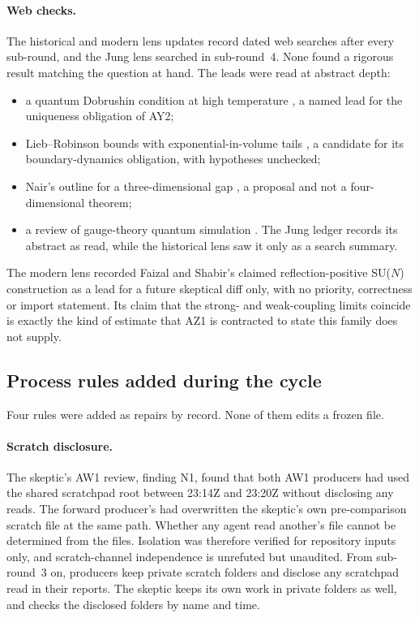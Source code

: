 \paragraph{Web checks.}
The historical and modern lens updates record dated web searches after every
sub-round, and the Jung lens searched in sub-round~4. None found a rigorous
result matching the question at hand. The leads were read at abstract depth:
\begin{itemize}
\item a quantum Dobrushin condition at high temperature
\cite{dob}, a named lead for the uniqueness obligation of AY2;
\item Lieb--Robinson bounds with exponential-in-volume tails
\cite{mcdonough}, a candidate for its boundary-dynamics obligation, with
hypotheses unchecked;
\item Nair's outline for a three-dimensional gap \cite{nair}, a proposal and
not a four-dimensional theorem;
\item a review of gauge-theory quantum simulation \cite{davoudi}. The Jung
ledger records its abstract as read, while the historical lens saw it only as
a search summary.
\end{itemize}
The modern lens recorded Faizal and Shabir's claimed reflection-positive
SU($N$) construction \cite{faizal} as a lead for a future skeptical diff only,
with no priority, correctness or import statement. Its claim that the strong-
and weak-coupling limits coincide is exactly the kind of estimate that AZ1 is
contracted to state this family does not supply.

\subsection{Process rules added during the cycle}
\label{sec:history-rules}
Four rules were added as repairs by record. None of them edits a frozen file.

\paragraph{Scratch disclosure.}
The skeptic's AW1 review, finding N1, found that both AW1 producers had used
the shared scratchpad root between 23:14Z and 23:20Z without disclosing any
reads. The forward producer's  had overwritten the skeptic's
own pre-comparison scratch file at the same path. Whether any agent read
another's file cannot be determined from the files. Isolation was therefore
verified for repository inputs only, and scratch-channel independence is
unrefuted but unaudited. From sub-round~3 on, producers keep private scratch
folders and disclose any scratchpad read in their reports. The skeptic keeps
its own work in private folders as well, and checks the disclosed folders by
name and time.

